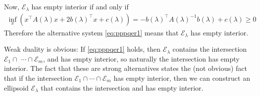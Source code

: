 \documentclass{article}
\begin{document}
Now, $\mathcal{E}_{\lambda}$ has empty interior if and only if
\begin{align*}
\inf _{x}\left(x^{\top} A(\lambda) x+2 b(\lambda)^{\top} x+c(\lambda)\right)=-b(\lambda)^{\top} A(\lambda)^{-1} b(\lambda)+c(\lambda) \geq 0
\end{align*}
Therefore the alternative system \cref{eq:pppqer1} means that $\mathcal{E}_{\lambda}$ has empty interior.

Weak duality is obvious: If \cref{eq:pppqer1} holds, then $\mathcal{E}_{\lambda}$ contains the intersection $\mathcal{E}_{1} \cap$ $\cdots \cap \mathcal{E}_{m}$, and has empty interior, so naturally the intersection has empty interior. The fact that these are strong alternatives states the (not obvious) fact that if the intersection $\mathcal{E}_{1} \cap \cdots \cap \mathcal{E}_{m}$ has empty interior, then we can construct an ellipsoid $\mathcal{E}_{\lambda}$ that contains the intersection and has empty interior.
\end{document}

